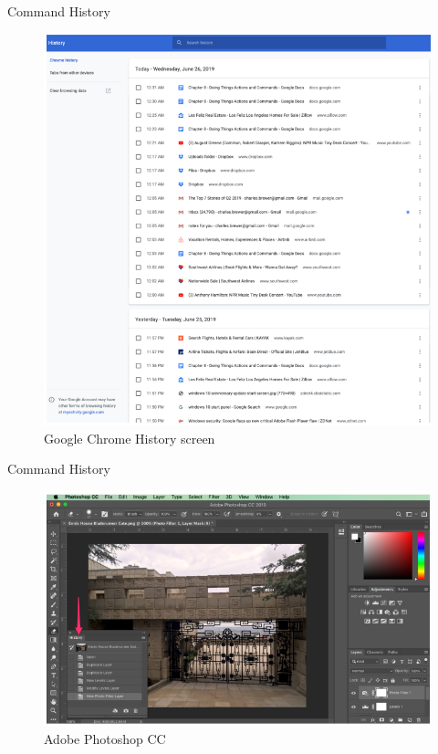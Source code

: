 \documentclass{beamer}
\begin{document}
\begin{frame}[t]{Command History}
	\begin{figure}[h]
		\centering
		\includegraphics[scale=0.6]{images/lec08-pic25.png}
		\caption{Google Chrome History screen}
	\end{figure}
\end{frame}

\begin{frame}[t]{Command History}
	\begin{figure}[h]
		\centering
		\includegraphics[scale=0.6]{images/lec08-pic26.png}
		\caption{Adobe Photoshop CC}
	\end{figure}
\end{frame}
\end{document}
